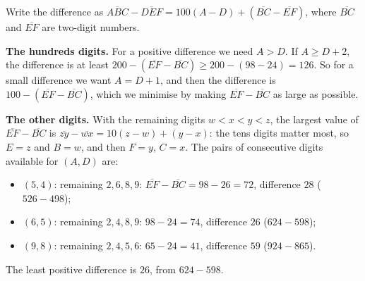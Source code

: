 Write the difference as $\overline{ABC}-\overline{DEF}=100(A-D)+\left(\overline{BC}-\overline{EF}\right)$, where $\overline{BC}$ and $\overline{EF}$ are two-digit numbers.

\textbf{The hundreds digits.} For a positive difference we need $A>D$. If $A\ge D+2$, the difference is at least $200-\left(\overline{EF}-\overline{BC}\right)\ge200-(98-24)=126$. So for a small difference we want $A=D+1$, and then the difference is $100-\left(\overline{EF}-\overline{BC}\right)$, which we minimise by making $\overline{EF}-\overline{BC}$ as large as possible.

\textbf{The other digits.} With the remaining digits $w<x<y<z$, the largest value of $\overline{EF}-\overline{BC}$ is $\overline{zy}-\overline{wx}=10(z-w)+(y-x)$: the tens digits matter most, so $E=z$ and $B=w$, and then $F=y$, $C=x$. The pairs of consecutive digits available for $(A,D)$ are:
\begin{itemize}
\item $(5,4)$: remaining $2,6,8,9$: $\overline{EF}-\overline{BC}=98-26=72$, difference $28$ ($526-498$);
\item $(6,5)$: remaining $2,4,8,9$: $98-24=74$, difference $26$ ($624-598$);
\item $(9,8)$: remaining $2,4,5,6$: $65-24=41$, difference $59$ ($924-865$).
\end{itemize}
The least positive difference is $\boxed{26}$, from $624-598$.
